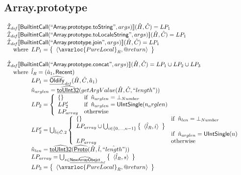\[\begin{array}{l}
\end{array}
\]


\subsection{Array.prototype}
\[
\begin{array}{l}
\aI_{\it def}\lbr \SF{BuiltintCall}(``\SF{Array.prototype.toString}",args)\rbr(\hat{H},\hat{C}) = LP_1\\
\aI_{\it def}\lbr \SF{BuiltintCall}(``\SF{Array.prototype.toLocaleString}",args)\rbr(\hat{H},\hat{C}) = LP_1\\
\aI_{\it def}\lbr \SF{BuiltintCall}(``\SF{Array.prototype.join}",args)\rbr(\hat{H},\hat{C}) = LP_1\\
\quad\wherec{
  LP_1 = \set{\langle\avarloc{PureLocal}_R,\varprop{return}\rangle}\\
  }\\
\\



\aI_{\it def}\lbr \SF{BuiltintCall}(``\SF{Array.prototype.concat}",args)\rbr(\hat{H},\hat{C}) = LP_1 \cup LP_2 \cup LP_3\\
\quad\wherec{
  \hat{l}_R = (\hat{a}_1, \SF{Recent})\\
  LP_1 = \ahf{Oldify}_{\it def}(\hat{H},\hat{C}, \hat{a}_1)\\
  \hat{n}_{arglen} = \ahf{toUInt32}(getArgValue(\hat{H},\hat{C}, ``length"))\\
  LP_2 = \left\{\begin{array}{ll}
      \set{} & \ifc{\hat{n}_{arglen} = \bot_{Number}}\\
      LP_2' & \ifc{\hat{n}_{arglen} = \SF{UIntSingle}(n_arglen)}\\
      LP_{array} & \owc
    \end{array}\right.\\
  LP_2' = \bigcup_{\hat{l} \in \hat{C}.2} \left\{\begin{array}{ll}
      \set{} & \ifc{\hat{n}_{len} = \bot_{Number}}\\
      LP_{array} \cup \bigcup_{i \in \{0,...,n-1\}} \set{\langle \hat{l}_R, i\rangle}\\ & \ifc{\hat{n}_{arglen} = \SF{UIntSingle}(n)}\\
      LP_{array}  & \owc
    \end{array}\right.\\
  \hat{n}_{len} = \ahf{toUInt32}(\ahf{Proto}(\hat{H}, \hat{l}, \hat{``length"}))\\
  LP_{array} = \bigcup_{s \in \ahf{NewArrayObejct}_{\it def}} \set{\langle \hat{l}_R, s\rangle}\\
  LP_3 = \set{\langle\avarloc{PureLocal}_R,\varprop{return}\rangle}\\
  }\\
\\

\end{array}
\]
